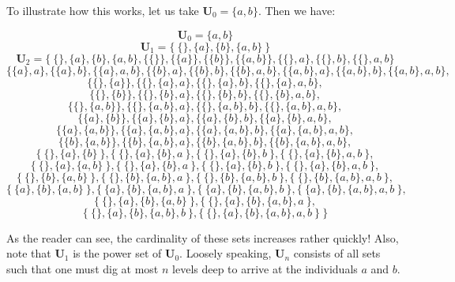 \documentclass[12pt]{article}
\begin{document}
To illustrate how this works, let us take $\mathbf{U}_0 = \{a, b \}$.  Then we have:

$$\mathbf{U}_0 = \{a, b \}$$
$$\mathbf{U}_1 = \{\> \{\}, \{a\}, \{b\}, \{a,b\} \> \}$$
$$\mathbf{U}_2 = \{\> \{\}, \{a\}, \{b\}, \{a,b\}, \{\{\}\}, \{\{a\}\}, \{\{b\}\}, \{\{a, b\}\}, \{\{\},a\}, \{\{\},b\}, \{\{\},a,b\}$$
$$\{\{a\},a\}, \{\{a\},b\}, \{\{a\},a,b\}, \{\{b\},a\}, \{\{b\},b\},
\{\{b\},a,b\}, \{\{a,b\},a\}, \{\{a,b\},b\} , \{\{a,b\},a,b\}, $$
$$\{ \{\}, \{a\} \}, \{ \{\}, \{a\}, a \}, \{ \{\}, \{a\}, b \} ,\{ \{\}, \{a\}, a, b \},$$
$$\{ \{\}, \{b\} \}, \{ \{\}, \{b\}, a \}, \{ \{\}, \{b\}, b \}, \{ \{\}, \{b\}, a, b \},$$
$$\{ \{\}, \{a,b\} \}, \{ \{\}, \{a,b\}, a \}, \{ \{\}, \{a,b\}, b \}, \{ \{\}, \{a,b\}, a, b \},$$
$$\{ \{a\}, \{b\} \}, \{ \{a\}, \{b\}, a \}, \{ \{a\}, \{b\}, b \}, \{ \{a\}, \{b\}, a, b \},$$
$$\{ \{a\}, \{a,b\} \}, \{ \{a\}, \{a,b\}, a \}, \{ \{a\}, \{a,b\}, b \}, \{ \{a\}, \{a,b\}, a, b \},$$
$$\{ \{b\}, \{a,b\} \}, \{ \{b\}, \{a,b\}, a \}, \{ \{b\}, \{a,b\}, b \}, \{ \{b\}, \{a,b\}, a, b \},$$
$$\{\> \{\}, \{a\}, \{b\} \> \}, \{\> \{\}, \{a\}, \{b\}, a \> \},
\{\> \{\}, \{a\}, \{b\}, b \> \}, \{\> \{\}, \{a\}, \{b\}, a, b \> \},$$
$$\{\> \{\}, \{a\}, \{a,b\} \> \}, \{\> \{\}, \{a\}, \{b\}, a \> \},
\{\> \{\}, \{a\}, \{b\}, b \> \}, \{\> \{\}, \{a\}, \{b\}, a, b \> \},$$
$$\{\> \{\}, \{b\}, \{a,b\} \> \}, \{\> \{\}, \{b\}, \{a,b\}, a \> \},
\{\> \{\}, \{b\}, \{a,b\}, b \> \}, \{\> \{\}, \{b\}, \{a,b\}, a, b \> \},$$
$$\{\> \{a\}, \{b\}, \{a,b\} \> \}, \{\> \{a\}, \{b\}, \{a,b\}, a \> \},
\{\> \{a\}, \{b\}, \{a,b\}, b \> \}, \{\> \{a\}, \{b\}, \{a,b\}, a, b \> \},$$
$$\{\> \{\}, \{a\}, \{b\}, \{a,b\} \> \},
\{\> \{\}, \{a\}, \{b\}, \{a,b\}, a \> \},$$
$$\{\> \{\}, \{a\}, \{b\}, \{a,b\}, b \> \},
\{\> \{\}, \{a\}, \{b\}, \{a,b\},a , b \> \} \>\}$$

As the reader can see, the cardinality of these sets increases rather quickly!  Also, note that $\mathbf{U}_1$ is the power set of $\mathbf{U}_0$.  Loosely speaking, $\mathbf{U}_n$ consists of all sets such that one must dig at most 
$n$ levels deep to arrive at the individuals $a$ and $b$.
\end{document}
